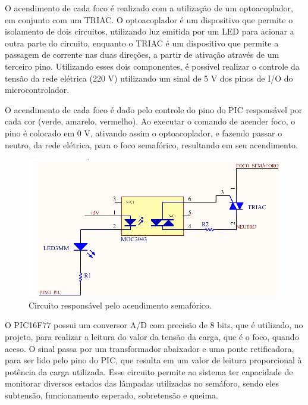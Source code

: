 O acendimento de cada foco é realizado com a utilização de um optoacoplador, em conjunto com um TRIAC. O optoacoplador é um dispositivo que permite o isolamento de dois circuitos, utilizando luz emitida por um LED para acionar a outra parte do circuito, 
enquanto o TRIAC é um dispositivo que permite a passagem de corrente nas duas direções, a partir de ativação através de um terceiro pino. 
Utilizando esses dois componentes, é possível realizar o controle da tensão da rede elétrica (220 V) utilizando um sinal de 5 V dos pinos de I/O do microcontrolador.

O acendimento de cada foco é dado pelo controle do pino do PIC responsável por cada cor (verde, amarelo, vermelho). Ao executar o comando de acender foco, o pino é colocado em 0 V, ativando assim o optoacoplador, e fazendo passar o neutro, da rede elétrica, para o foco semafórico, resultando em seu acendimento.

\begin{figure}[ht]
    \begin{center}
    \includegraphics{figuras/moc_triac.PNG}
    \end{center}
    \caption[Acendimento semafórico]{Circuito responsável pelo acendimento semafórico.}
    \label{moc_triac}
\end{figure}

O PIC16F77 possui um conversor A/D com precisão de 8 bits, que é utilizado, no projeto, para realizar a leitura do valor da tensão da carga, que é o foco, quando aceso. O sinal passa por um transformador abaixador e uma ponte retificadora, para ser lido pelo pino do PIC, que resulta em um valor de leitura proporcional à potência da carga utilizada. Esse circuito permite ao sistema ter capacidade de monitorar diversos estados das lâmpadas utilizadas no semáforo, sendo eles subtensão, funcionamento esperado, sobretensão e queima.

